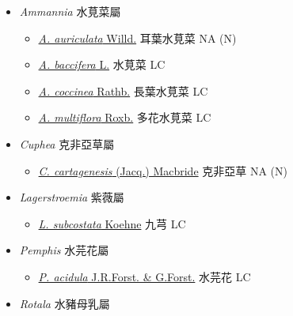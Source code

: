 
  \begin{itemize}
 \item[] \textit{Ammannia} 水莧菜屬
                                
  \begin{itemize}
        \item[] \href{http://www.theplantlist.org/tpl1.1/search?q=Ammannia+auriculata}{\textit{A. auriculata} Willd.}   耳葉水莧菜   NA (N)
        \item[] \href{http://www.theplantlist.org/tpl1.1/search?q=Ammannia+baccifera}{\textit{A. baccifera} L.}   水莧菜   LC
        \item[] \href{http://www.theplantlist.org/tpl1.1/search?q=Ammannia+coccinea}{\textit{A. coccinea} Rathb.}   長葉水莧菜   LC
        \item[] \href{http://www.theplantlist.org/tpl1.1/search?q=Ammannia+multiflora}{\textit{A. multiflora} Roxb.}   多花水莧菜   LC
  \end{itemize}
 \item[] \textit{Cuphea} 克非亞草屬
                                
  \begin{itemize}
        \item[] \href{http://www.theplantlist.org/tpl1.1/search?q=Cuphea+cartagenesis}{\textit{C. cartagenesis} (Jacq.) Macbride}   克非亞草   NA (N)
  \end{itemize}
 \item[] \textit{Lagerstroemia} 紫薇屬
                                
  \begin{itemize}
        \item[] \href{http://www.theplantlist.org/tpl1.1/search?q=Lagerstroemia+subcostata}{\textit{L. subcostata} Koehne}   九芎   LC
  \end{itemize}
 \item[] \textit{Pemphis} 水芫花屬
                                
  \begin{itemize}
        \item[] \href{http://www.theplantlist.org/tpl1.1/search?q=Pemphis+acidula}{\textit{P. acidula} J.R.Forst. \& G.Forst.}   水芫花   LC
  \end{itemize}
 \item[] \textit{Rotala} 水豬母乳屬
                                

\end{itemize}
